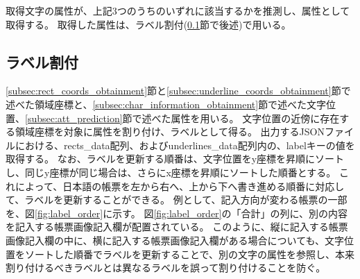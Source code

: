 取得文字の属性が、上記3つのうちのいずれに該当するかを推測し、属性として取得する。
取得した属性は、ラベル割付(\ref{subsec:label_link}節で後述)で用いる。

\subsection{ラベル割付}\label{subsec:label_link}
\ref{subsec:rect_coords_obtainment}節と\ref{subsec:underline_coords_obtainment}節で述べた領域座標と、\ref{subsec:char_information_obtainment}節で述べた文字位置、\ref{subsec:att_prediction}節で述べた属性を用いる。
文字位置の近傍に存在する領域座標を対象に属性を割り付け、ラベルとして得る。
出力するJSONファイルにおける、rects\_data配列、およびunderlines\_data配列内の、labelキーの値を取得する。
なお、ラベルを更新する順番は、文字位置をy座標を昇順にソートし、同じy座標が同じ場合は、さらにx座標を昇順にソートした順番とする。
これによって、日本語の帳票を左から右へ、上から下へ書き進める順番に対応して、ラベルを更新することができる。
例として、記入方向が変わる帳票の一部を、図\ref{fig:label_order}に示す。
図\ref{fig:label_order}の「合計」の列に、別の内容を記入する帳票画像記入欄が配置されている。
このように、縦に記入する帳票画像記入欄の中に、横に記入する帳票画像記入欄がある場合についても、文字位置をソートした順番でラベルを更新することで、別の文字の属性を参照し、本来割り付けるべきラベルとは異なるラベルを誤って割り付けることを防ぐ。

